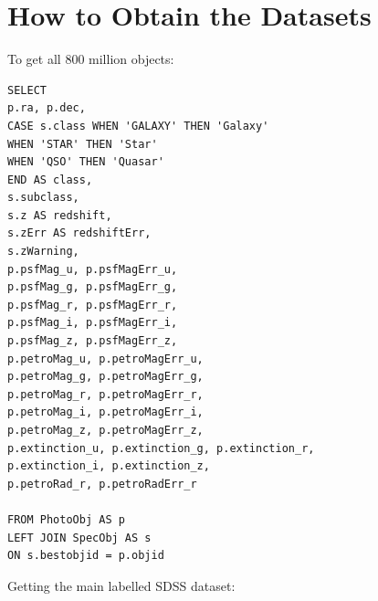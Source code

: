 
\appendix

\chapter{How to Obtain the Datasets}
\label{cha:datasets}

To get all 800 million objects:

\begin{verbatim}
SELECT
p.ra, p.dec,
CASE s.class WHEN 'GALAXY' THEN 'Galaxy'
WHEN 'STAR' THEN 'Star'
WHEN 'QSO' THEN 'Quasar'
END AS class,
s.subclass,
s.z AS redshift,
s.zErr AS redshiftErr,
s.zWarning,
p.psfMag_u, p.psfMagErr_u,
p.psfMag_g, p.psfMagErr_g,
p.psfMag_r, p.psfMagErr_r,
p.psfMag_i, p.psfMagErr_i,
p.psfMag_z, p.psfMagErr_z,
p.petroMag_u, p.petroMagErr_u,
p.petroMag_g, p.petroMagErr_g,
p.petroMag_r, p.petroMagErr_r,
p.petroMag_i, p.petroMagErr_i,
p.petroMag_z, p.petroMagErr_z,
p.extinction_u, p.extinction_g, p.extinction_r,
p.extinction_i, p.extinction_z,
p.petroRad_r, p.petroRadErr_r

FROM PhotoObj AS p
LEFT JOIN SpecObj AS s
ON s.bestobjid = p.objid
\end{verbatim}


Getting the main labelled SDSS dataset:

